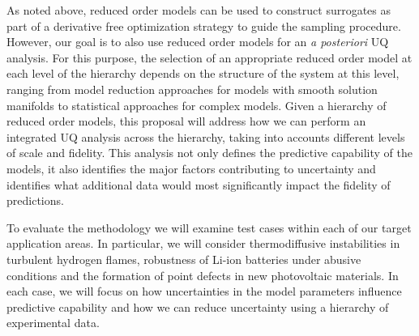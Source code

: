 \documentclass[11pt]{article}
\begin{document}
As noted above, reduced order models can be used to construct surrogates as part of a derivative free optimization strategy
to guide the sampling procedure. However, our goal is to also use reduced order models for an {\it {a posteriori}} UQ analysis.
For this purpose, the selection of an appropriate reduced order model at each level of the hierarchy depends on the
structure of the system at this level, ranging from model reduction approaches for models with smooth solution manifolds
to statistical approaches for complex models.
Given a hierarchy of reduced order models, this proposal will address how we can perform an integrated UQ analysis 
across the hierarchy, taking into accounts different levels of scale and fidelity.
This analysis not only defines the predictive capability of the models, it also identifies
the major factors contributing to uncertainty and identifies what additional data would most significantly
impact the fidelity of predictions.

To evaluate the methodology we will examine test cases within each of our target application areas.  In particular,
we will consider thermodiffusive instabilities in turbulent hydrogen flames, robustness of Li-ion batteries under abusive conditions
and the formation of point defects in new photovoltaic materials.  In each case, we will focus on how uncertainties in the 
model parameters influence predictive capability and how we can reduce uncertainty using a hierarchy of experimental data.
\end{document}
